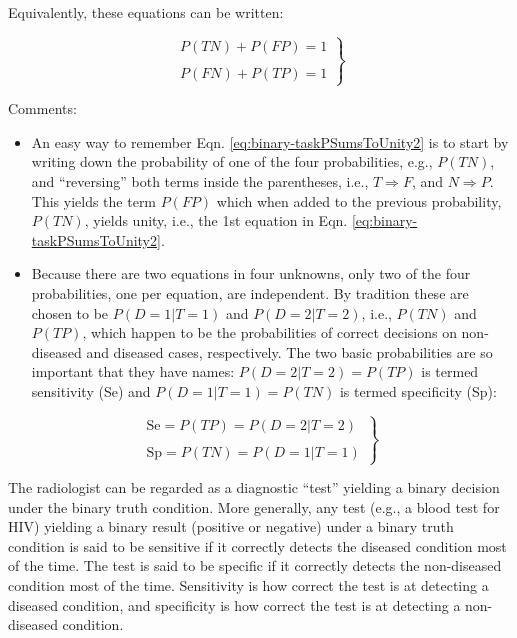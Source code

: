 \documentclass[
]{book}
\providecommand{\tightlist}{%
  \setlength{\itemsep}{0pt}\setlength{\parskip}{0pt}}
\begin{document}
Equivalently, these equations can be written:

\begin{equation} 
\left.\begin{matrix}
P(TN)+P(FP)=1\\ 
\\
P(FN)+P(TP)=1
\end{matrix}\right\}
\label{eq:binary-taskPSumsToUnity2}
\end{equation}

Comments:

\begin{itemize}
\tightlist
\item
  An easy way to remember Eqn. \eqref{eq:binary-taskPSumsToUnity2} is to start by writing down the probability of one of the four probabilities, e.g., \(P(TN)\), and ``reversing'' both terms inside the parentheses, i.e., \(T \Rightarrow F\), and \(N \Rightarrow P\). This yields the term \(P(FP)\) which when added to the previous probability, \(P(TN)\), yields unity, i.e., the 1st equation in Eqn. \eqref{eq:binary-taskPSumsToUnity2}.
\item
  Because there are two equations in four unknowns, only two of the four probabilities, one per equation, are independent. By tradition these are chosen to be \(P(D=1|T=1)\) and \(P(D=2|T=2)\), i.e., \(P(TN)\) and \(P(TP)\), which happen to be the probabilities of correct decisions on non-diseased and diseased cases, respectively. The two basic probabilities are so important that they have names: \(P(D=2|T=2)=P(TP)\) is termed sensitivity (Se) and \(P(D=1|T=1)=P(TN)\) is termed specificity (Sp):
\end{itemize}

\begin{equation} 
\left.\begin{matrix}
\text{Se}=P(TP)=P(D=2|T=2)\\ 
\\
\text{Sp}=P(TN)=P(D=1|T=1)
\end{matrix}\right\}
\label{eq:binary-taskSeSp}
\end{equation}

The radiologist can be regarded as a diagnostic ``test'' yielding a binary decision under the binary truth condition. More generally, any test (e.g., a blood test for HIV) yielding a binary result (positive or negative) under a binary truth condition is said to be sensitive if it correctly detects the diseased condition most of the time. The test is said to be specific if it correctly detects the non-diseased condition most of the time. Sensitivity is how correct the test is at detecting a diseased condition, and specificity is how correct the test is at detecting a non-diseased condition.
\end{document}
